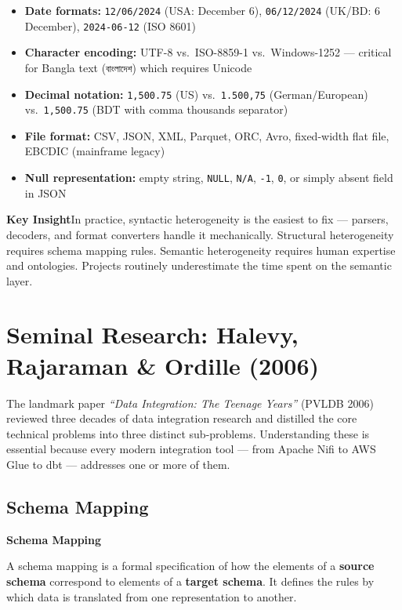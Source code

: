\documentclass[12pt,a4paper]{article}
\newcommand{\defbox}[2]{%
  \noindent
  \colorbox{PUNavy!12}{%
    \begin{minipage}{\dimexpr\linewidth-2\fboxsep}
      \vspace{4pt}\textbf{\textcolor{PUNavy}{#1}}\par\vspace{2pt}
      #2\vspace{4pt}
    \end{minipage}%
  }\par\vspace{6pt}%
}
\newcommand{\insightbox}[1]{%
  \noindent
  \colorbox{PUGold!18}{%
    \begin{minipage}{\dimexpr\linewidth-2\fboxsep}
      \vspace{4pt}\textcolor{PUGold!70!black}{\textbf{Key Insight}}\quad #1
      \vspace{4pt}
    \end{minipage}%
  }\par\vspace{6pt}%
}
\begin{document}
\begin{itemize}[leftmargin=1.8em]
  \item \textbf{Date formats:} \texttt{12/06/2024} (USA: December 6), \texttt{06/12/2024} (UK/BD: 6 December), \texttt{2024-06-12} (ISO 8601)
  \item \textbf{Character encoding:} UTF-8 vs.\ ISO-8859-1 vs.\ Windows-1252 --- critical for Bangla text (\texttt{বাংলাদেশ}) which requires Unicode
  \item \textbf{Decimal notation:} \texttt{1,500.75} (US) vs.\ \texttt{1.500,75} (German/European) vs.\ \texttt{1{,}500.75} (BDT with comma thousands separator)
  \item \textbf{File format:} CSV, JSON, XML, Parquet, ORC, Avro, fixed-width flat file, EBCDIC (mainframe legacy)
  \item \textbf{Null representation:} empty string, \texttt{NULL}, \texttt{N/A}, \texttt{-1}, \texttt{0}, or simply absent field in JSON
\end{itemize}

\insightbox{In practice, syntactic heterogeneity is the easiest to fix — parsers, decoders, and format converters handle it mechanically.  Structural heterogeneity requires schema mapping rules.  Semantic heterogeneity requires human expertise and ontologies.  Projects routinely underestimate the time spent on the semantic layer.}

\section{Seminal Research: Halevy, Rajaraman \& Ordille (2006)}

The landmark paper \textit{``Data Integration: The Teenage Years''} (PVLDB 2006) reviewed three decades of data integration research and distilled the core technical problems into three distinct sub-problems.  Understanding these is essential because every modern integration tool — from Apache Nifi to AWS Glue to dbt — addresses one or more of them.

\subsection{Schema Mapping}

\defbox{Schema Mapping}{A schema mapping is a formal specification of how the elements of a \textbf{source schema} correspond to elements of a \textbf{target schema}.  It defines the rules by which data is translated from one representation to another.}
\end{document}
